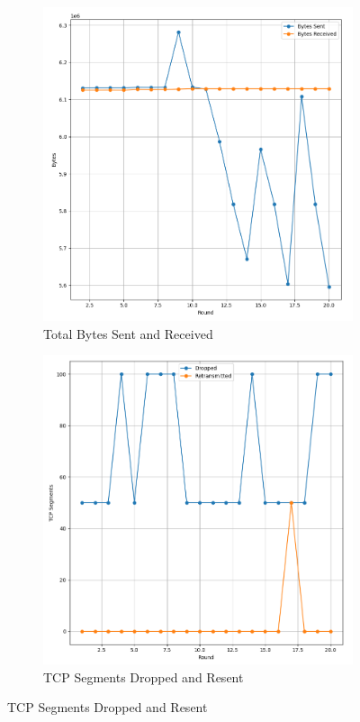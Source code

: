 \documentclass[12pt]{article}
\begin{document}
\begin{figure}[hbt!]
\medskip
\begin{subfigure}{.475\linewidth}
  \includegraphics[width=\linewidth]{bytes}
  \caption{Total Bytes Sent and Received}
  \label{fig:bytes}
\end{subfigure}\hfill
\begin{subfigure}[b]{.475\linewidth}
  \includegraphics[width=\linewidth]{tcp}
  \caption{TCP Segments Dropped and Resent}
  \label{fig:tcp}
\end{subfigure}


\end{figure}
\end{document}
